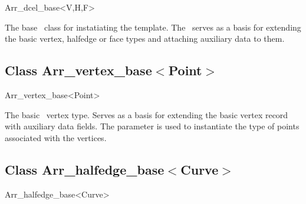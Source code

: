 
\ccRefPageBegin

\begin{ccRefClass}{Arr_dcel_base<V,H,F>}
\label{arr_ref:arr_dcel_base}
    
\ccDefinition

The base \dcel\ class for instatiating the  template.
The \ccClassTemplateName\ serves as a basis for extending the basic vertex,
halfedge or face types and attaching auxiliary data to them.

 
\ccIsModel


\subsection*{Class Arr\_vertex\_base$<$Point$>$}

\begin{ccClass}{Arr_vertex_base<Point>}

\ccDefinition

The basic \dcel\ vertex type. Serves as a basis for extending the basic
vertex record with auxiliary data fields. The  parameter is used
to instantiate the type of points associated with the vertices.

\ccIsModel

\end{ccClass}


\subsection*{Class Arr\_halfedge\_base$<$Curve$>$}

\begin{ccClass}{Arr_halfedge_base<Curve>}


\end{ccClass}
\end{ccRefClass}
